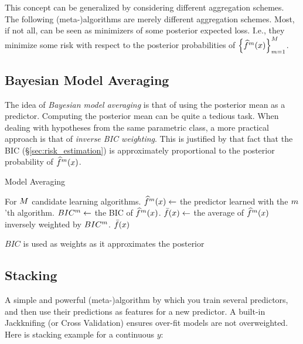 This concept can be generalized by considering different aggregation schemes. The following (meta-)algorithms are merely different aggregation schemes. Most, if not all, can be seen as minimizers of some posterior expected loss. I.e., they minimize some risk with respect to the posterior probabilities of $\left\{ \widehat{f}^m(x)  \right\}_{m=1}^M $.


\subsection{Bayesian Model Averaging}
The idea of \emph{Bayesian model averaging} is that of using the posterior mean as a predictor. 
Computing the posterior mean can be quite a tedious task. 
When dealing with hypotheses from the same parametric class, a more practical approach is that of \emph{inverse BIC weighting}. 
This is justified by that fact that the BIC (\S\ref{sec:risk_estimation}) is approximately proportional to the posterior probability of $\widehat{f}^m(x)$.


\begin{algorithm}[H]
\caption{Model Averaging}
\label{algo:model_averaging}
\begin{algorithmic}
\State For $M$ candidate learning algorithms.
	\State $\widehat{f}^m(x) \gets$ the predictor learned with the $m$'th algorithm.
	\State $BIC^m \gets$ the BIC of $\widehat{f}^m(x)$.
\EndFor
\State $\bar{f}(x) \gets$ the average of $\widehat{f}^m(x)$ inversely weighted by $BIC^m$. 
\State \Return $\bar{f}(x)$
\end{algorithmic}
\end{algorithm}

$BIC$ is used as weights as it approximates the posterior 







\subsection{Stacking}
A simple and powerful (meta-)algorithm by which you train several predictors, and then use their predictions as features for a new predictor. 
A built-in Jackknifing (or Cross Validation) ensures over-fit models are not overweighted.
Here is  stacking example for a continuous $y$:

